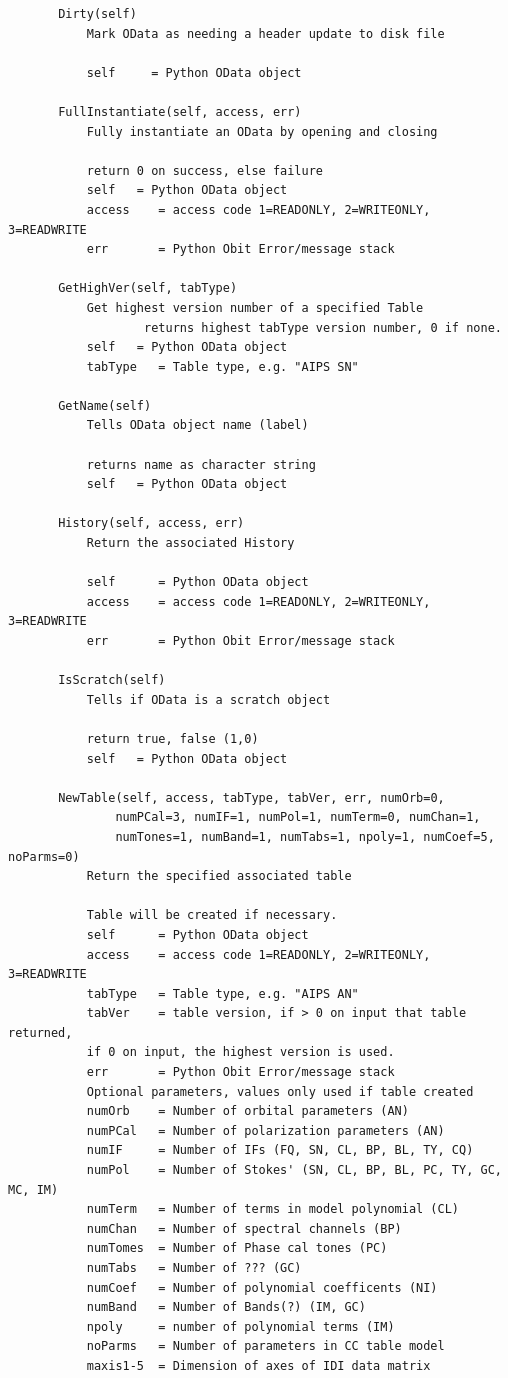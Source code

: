 \documentclass[11pt]{report}
\begin{document}
\begin{verbatim}
       Dirty(self)
           Mark OData as needing a header update to disk file
           
           self     = Python OData object
       
       FullInstantiate(self, access, err)
           Fully instantiate an OData by opening and closing
           
           return 0 on success, else failure
           self   = Python OData object
           access    = access code 1=READONLY, 2=WRITEONLY, 3=READWRITE
           err       = Python Obit Error/message stack
       
       GetHighVer(self, tabType)
           Get highest version number of a specified Table
                   returns highest tabType version number, 0 if none.
           self   = Python OData object
           tabType   = Table type, e.g. "AIPS SN"
       
       GetName(self)
           Tells OData object name (label)
           
           returns name as character string
           self   = Python OData object
       
       History(self, access, err)
           Return the associated History
           
           self      = Python OData object
           access    = access code 1=READONLY, 2=WRITEONLY, 3=READWRITE
           err       = Python Obit Error/message stack
       
       IsScratch(self)
           Tells if OData is a scratch object
           
           return true, false (1,0)
           self   = Python OData object
       
       NewTable(self, access, tabType, tabVer, err, numOrb=0,
               numPCal=3, numIF=1, numPol=1, numTerm=0, numChan=1, 
               numTones=1, numBand=1, numTabs=1, npoly=1, numCoef=5, noParms=0)
           Return the specified associated table
           
           Table will be created if necessary.
           self      = Python OData object
           access    = access code 1=READONLY, 2=WRITEONLY, 3=READWRITE
           tabType   = Table type, e.g. "AIPS AN"
           tabVer    = table version, if > 0 on input that table returned,
           if 0 on input, the highest version is used.
           err       = Python Obit Error/message stack
           Optional parameters, values only used if table created
           numOrb    = Number of orbital parameters (AN)
           numPCal   = Number of polarization parameters (AN)
           numIF     = Number of IFs (FQ, SN, CL, BP, BL, TY, CQ)
           numPol    = Number of Stokes' (SN, CL, BP, BL, PC, TY, GC, MC, IM)
           numTerm   = Number of terms in model polynomial (CL)
           numChan   = Number of spectral channels (BP)
           numTomes  = Number of Phase cal tones (PC)
           numTabs   = Number of ??? (GC)
           numCoef   = Number of polynomial coefficents (NI)
           numBand   = Number of Bands(?) (IM, GC)
           npoly     = number of polynomial terms (IM)
           noParms   = Number of parameters in CC table model
           maxis1-5  = Dimension of axes of IDI data matrix
       

\end{verbatim}
\end{document}
